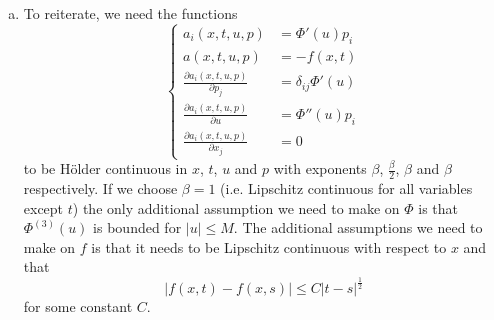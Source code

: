 \documentclass[11pt, a4paper]{article}
\begin{document}
\begin{appendices}
\begin{enumerate}[a)]
	\item To reiterate, we need the functions
	\begin{equation*}
		\begin{cases}
			a_i(x,t,u,p) &= \Phi'(u)p_i \\
			a(x,t,u,p) &= -f(x,t) \\
			\frac{\partial a_i(x,t,u,p)}{\partial p_j} &= \delta_{ij}\Phi'(u) \\
			\frac{\partial a_i(x,t,u,p)}{\partial u} &= \Phi''(u)p_i \\
			\frac{\partial a_i(x,t,u,p)}{\partial x_j} &= 0
		\end{cases}
	\end{equation*}
	to be Hölder continuous in $x$, $t$, $u$ and $p$ with exponents $\beta$, $\frac{\beta}{2}$, $\beta$ and $\beta$ respectively. If we choose $\beta = 1$ (i.e. Lipschitz continuous for all variables except $t$) the only additional assumption we need to make on $\Phi$ is that $\Phi^{(3)}(u)$ is bounded for $|u| \leq M$. The additional assumptions we need to make on $f$ is that it needs to be Lipschitz continuous with respect to $x$ and that
	\begin{equation*}
	|f(x,t) - f(x,s)| \leq C|t-s|^\frac{1}{2}
	\end{equation*}
	for some constant $C$.
	
	
\end{enumerate}
\end{appendices}


\newpage


\end{document}
